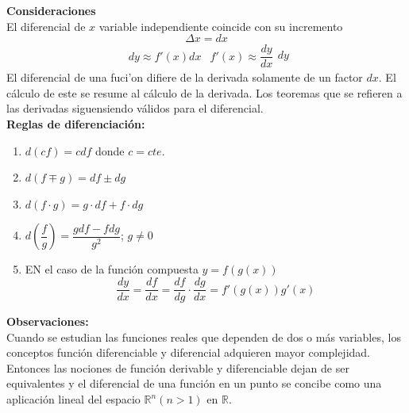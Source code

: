 \documentclass[10pt,twoside]{SelfArx} %
\begin{document}
  \textbf{Consideraciones}\\
  El diferencial de $ x $ variable independiente coincide con su incremento 
  \[ \Delta x=dx \]
  \[ 
  \begin{array}{ll}
  dy\approx f'(x)dx & f'(x)\approx\dfrac{dy}{dx}
  \end{array}dy \]
  El diferencial de una fuci'on difiere de la derivada solamente de un factor $ dx $. El c\'alculo de  este se resume al c\'alculo de la derivada. Los teoremas que se refieren a las derivadas siguensiendo v\'alidos para el diferencial.\\
  \textbf{Reglas de diferenciaci\'on:}\\
  \begin{enumerate}
  	\item $ d(cf)=cdf $ donde $ c=cte $.
  	\item $ d(f\mp g)=df\pm dg $
  	\item $ d(f\cdot g)=g\cdot df+f\cdot dg $
  	\item $ d\left (\dfrac{f}{g}\right )=\dfrac{gdf-fdg}{g^{2}} $; $ g\neq0 $
  	\item EN el caso de la funci\'on compuesta $ y=f(g(x)) $
  	\begin{equation}
  	\dfrac{dy}{dx}=\dfrac{df}{dx}=\dfrac{df}{dg}\cdot\dfrac{dg}{dx}=f'(g(x))g'(x)
  	\end{equation}
  \end{enumerate}
  \textbf{Observaciones:}\\
  Cuando se estudian las funciones reales que dependen de dos o más variables, los
  conceptos función diferenciable y diferencial adquieren mayor complejidad. Entonces las
  nociones de función derivable y diferenciable dejan de ser equivalentes y el diferencial de
  una función en un punto se concibe como una aplicación lineal del espacio $ \mathbb{R}^{n}(n>1) $ en $ \mathbb{R} $.
  
  
  
  
\end{document}
